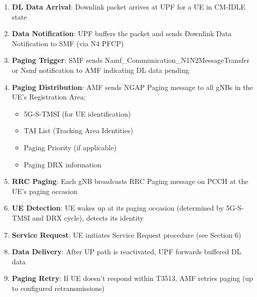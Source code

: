 \begin{enumerate}
\def\labelenumi{\arabic{enumi}.}
\tightlist
\item
  \textbf{DL Data Arrival}: Downlink packet arrives at UPF for a UE in CM-IDLE state
\item
  \textbf{Data Notification}: UPF buffers the packet and sends Downlink Data Notification to SMF (via N4 PFCP)
\item
  \textbf{Paging Trigger}: SMF sends Namf\_\allowbreak{}Communication\_\allowbreak{}N1N2MessageTransfer or Nsmf notification to AMF indicating DL data pending
\item
  \textbf{Paging Distribution}: AMF sends NGAP Paging message to all gNBs in the UE’s Registration Area:

  \begin{itemize}
  \tightlist
  \item
    5G-S-TMSI (for UE identification)
  \item
    TAI List (Tracking Area Identities)
  \item
    Paging Priority (if applicable)
  \item
    Paging DRX information
  \end{itemize}
\item
  \textbf{RRC Paging}: Each gNB broadcasts RRC Paging message on PCCH at the UE’s paging occasion
\item
  \textbf{UE Detection}: UE wakes up at its paging occasion (determined by 5G-S-TMSI and DRX cycle), detects its identity
\item
  \textbf{Service Request}: UE initiates Service Request procedure (see Section 6)
\item
  \textbf{Data Delivery}: After UP path is reactivated, UPF forwards buffered DL data
\item
  \textbf{Paging Retry}: If UE doesn’t respond within T3513, AMF retries paging (up to configured retransmissions)
\end{enumerate}






